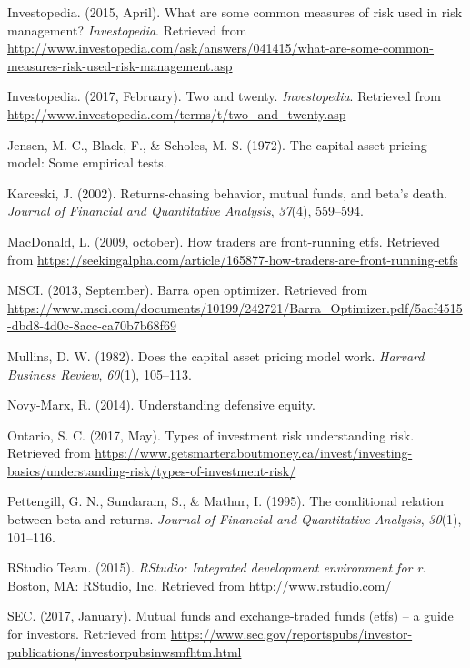 \documentclass[12pt,twoside]{reedthesis}
\theoremstyle{definition}
\theoremstyle{definition}
\theoremstyle{definition}
\theoremstyle{remark}
\begin{document}
\hypertarget{ref-investopedia2015}{}
Investopedia. (2015, April). What are some common measures of risk used
in risk management? \emph{Investopedia}. Retrieved from
\url{http://www.investopedia.com/ask/answers/041415/what-are-some-common-measures-risk-used-risk-management.asp}

\hypertarget{ref-investopedia2017}{}
Investopedia. (2017, February). Two and twenty. \emph{Investopedia}.
Retrieved from
\url{http://www.investopedia.com/terms/t/two_and_twenty.asp}

\hypertarget{ref-jensen1972}{}
Jensen, M. C., Black, F., \& Scholes, M. S. (1972). The capital asset
pricing model: Some empirical tests.

\hypertarget{ref-karceski2002}{}
Karceski, J. (2002). Returns-chasing behavior, mutual funds, and beta's
death. \emph{Journal of Financial and Quantitative Analysis},
\emph{37}(4), 559--594.

\hypertarget{ref-macdonald2009}{}
MacDonald, L. (2009, october). How traders are front-running etfs.
Retrieved from
\url{https://seekingalpha.com/article/165877-how-traders-are-front-running-etfs}

\hypertarget{ref-msci2013}{}
MSCI. (2013, September). Barra open optimizer. Retrieved from
\url{https://www.msci.com/documents/10199/242721/Barra_Optimizer.pdf/5acf4515-dbd8-4d0c-8acc-ca70b7b68f69}

\hypertarget{ref-mullins1982}{}
Mullins, D. W. (1982). Does the capital asset pricing model work.
\emph{Harvard Business Review}, \emph{60}(1), 105--113.

\hypertarget{ref-novy2014}{}
Novy-Marx, R. (2014). Understanding defensive equity.

\hypertarget{ref-ontario2017}{}
Ontario, S. C. (2017, May). Types of investment risk \textbar{}
understanding risk. Retrieved from
\url{https://www.getsmarteraboutmoney.ca/invest/investing-basics/understanding-risk/types-of-investment-risk/}

\hypertarget{ref-pettengill1995}{}
Pettengill, G. N., Sundaram, S., \& Mathur, I. (1995). The conditional
relation between beta and returns. \emph{Journal of Financial and
Quantitative Analysis}, \emph{30}(1), 101--116.

\hypertarget{ref-rstudio2017}{}
RStudio Team. (2015). \emph{RStudio: Integrated development environment
for r}. Boston, MA: RStudio, Inc. Retrieved from
\url{http://www.rstudio.com/}

\hypertarget{ref-sec2017}{}
SEC. (2017, January). Mutual funds and exchange-traded funds (etfs) -- a
guide for investors. Retrieved from
\url{https://www.sec.gov/reportspubs/investor-publications/investorpubsinwsmfhtm.html}
\end{document}

